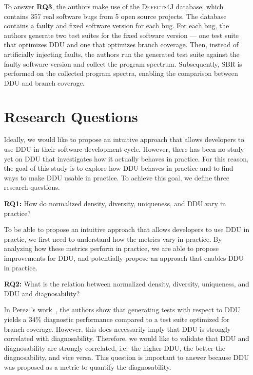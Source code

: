 \documentclass[twoside,a4paper,11pt]{memoir}
\begin{document}
To answer \textbf{RQ3}, the authors make use of the \textsc{Defects4J} database, which contains 357 real software bugs from 5 open source projects.
The database contains a faulty and fixed software version for each bug.
For each bug, the authors generate two test suites for the fixed software version --- one test suite that optimizes DDU and one that optimizes branch coverage.
Then, instead of artificially injecting faults, the authors run the generated test suite against the faulty software version and collect the program spectrum.
Subsequently, SBR is performed on the collected program spectra, enabling the comparison between DDU and branch coverage.

\chapter{Research Questions}%
\label{ch:research_questions}
Ideally, we would like to propose an intuitive approach that allows developers to use DDU in their software development cycle.
However, there has been no study yet on DDU that investigates how it actually behaves in practice.
For this reason, the goal of this study is to explore how DDU behaves in practice and to find ways to make DDU usable in practice.
To achieve this goal, we define three research questions.

\begin{framed}
\noindent
\textbf{RQ1:} How do normalized density, diversity, uniqueness, and DDU vary in practice?
\end{framed}
To be able to propose an intuitive approach that allows developers to use DDU in practie, we first need to understand how the metrics vary in practice.
By analyzing how these metrics perform in practice, we are able to propose improvements for DDU, and potentially propose an approach that enables DDU in practice.

\begin{framed}
\noindent
\textbf{RQ2:} What is the relation between normalized density, diversity, uniqueness, and DDU and diagnosability?
\end{framed}
In Perez \etal's work~\cite{DBLP:conf/icse/PerezAD17}, the authors show that generating tests with respect to DDU yields a 34\% diagnostic performance compared to a test suite optimized for branch coverage.
However, this does necessarily imply that DDU is strongly correlated with diagnosability.
Therefore, we would like to validate that DDU and diagnosability are strongly correlated, i.e.\ the higher DDU, the better the diagnosability, and vice versa.
This question is important to answer because DDU was proposed as a metric to quantify the diagnosability.
\end{document}
